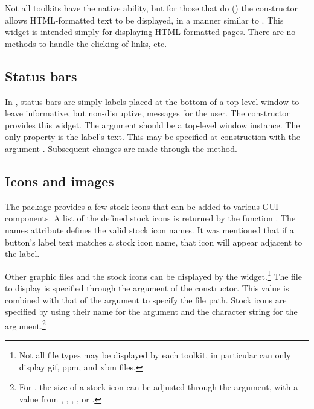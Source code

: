 Not all toolkits have the native ability, but for those that do (\Qt) the
 constructor allows HTML-formatted text to be
displayed, in a manner similar to . This widget is
intended simply for displaying HTML-formatted pages. There are no
methods to handle the clicking of links, etc.

\subsection{Status bars}
\label{sec:gWidgets-statusbars}

In , status bars are simply labels placed at the bottom of a
top-level window to leave informative, but non-disruptive, messages
for the user.  The  constructor provides this
widget.  The  argument should be a top-level window
instance.  The only property is the label's text. This may be
specified at construction with the argument
. Subsequent changes are made through the
 method.




\subsection{Icons and images}
\label{sec:gWidgets-displ-icons-imag}

The  package provides a few stock icons that can be
added to various GUI components. A list of the defined stock icons is
returned by the function .  The names attribute
defines the valid stock icon names. It was mentioned that if a
button's label text matches a stock icon name, that icon will appear
adjacent to the label.



Other graphic files and the stock icons can be displayed by the
 widget.\footnote{Not all file types may be
  displayed by each toolkit, in particular  can
  only display gif, ppm, and xbm files.} The file to display is
specified through the  argument of the
constructor. This value is combined with that of the
 argument to specify the file path.  Stock
icons are specified by using their name for the 
argument and the character string  for the
 argument.\footnote{For , the size
  of a stock icon can be adjusted through the 
  argument, with a value from , ,
  , , or .}

